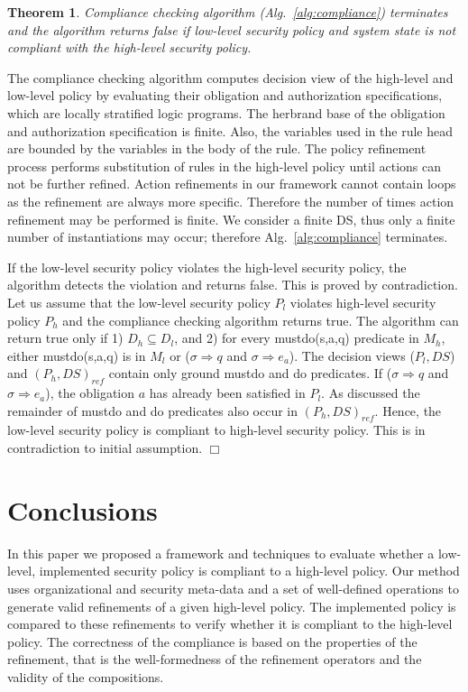 \documentclass[12pt,journal,letterpaper,onecolumn]{IEEEtran}
\newtheorem{theorem}{Theorem}[section]
\newenvironment{myproofsketch}
{\noindent {\bf Proof Sketch:}}{\hspace*{\fill}$\Box$}
\begin{document}
\begin{theorem}
Compliance checking algorithm (Alg.~\ref{alg:compliance}) terminates
and the algorithm returns false if low-level security policy and
system state is not compliant with the high-level security policy.
\end{theorem}
\begin{myproofsketch} The compliance checking algorithm computes decision
view of the high-level and low-level policy by evaluating their
obligation and authorization specifications, which are locally
stratified logic programs. The herbrand base of the obligation and
authorization specification is finite. Also, the variables used in
the rule head are bounded by the variables in the body of the rule.
The policy refinement process performs substitution of rules in the 
high-level policy until actions can not be further refined. Action refinements
in our framework cannot contain loops as the refinement are always
more specific. Therefore the number of times action refinement may
be performed is finite. We consider a finite DS, thus only a 
finite number of instantiations may occur; 
therefore Alg.~\ref{alg:compliance} terminates.

If the low-level security policy violates the high-level security
policy, the algorithm detects the violation and returns false. This
is proved by contradiction. Let us assume that the low-level
security policy $P_l$ violates high-level security policy $P_h$ and
the compliance checking algorithm returns true. The algorithm can
return true only if 1) $D_h \subseteq D_l$, and 2) for every
mustdo(s,a,q) predicate in $M_h$, either mustdo(s,a,q) is in $M_l$
or ($\sigma \Rightarrow q$ and $\sigma \Rightarrow e_a$). The
decision views ($P_l,DS$) and $(P_h,DS)_{ref}$ contain only
ground mustdo and do predicates. If ($\sigma \Rightarrow q$ and
$\sigma \Rightarrow e_a$), the obligation $a$ has already been
satisfied in $P_l$. As discussed the remainder of mustdo and do
predicates also occur in $(P_h,DS)_{ref}$. Hence, the low-level
security policy is compliant to high-level security policy. This is
in contradiction to initial assumption.
\end{myproofsketch}




\section{Conclusions}
\label{sec:conclude} In this paper we proposed a framework and
techniques to evaluate whether a low-level, implemented security
policy is compliant to a high-level policy.  Our method uses
organizational and security meta-data and a set of well-defined
operations to generate valid refinements of a given high-level
policy.  The implemented policy is compared to these refinements to
verify whether it is compliant to the high-level policy.  The
correctness of the compliance is based on the properties of the
refinement, that is the well-formedness of the refinement operators
and the validity of the compositions.
\end{document}
